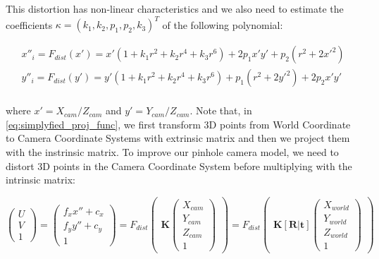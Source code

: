 \documentclass[a4paper]{report}
\numberwithin{figure}{section}
\begin{document}
This distortion has non-linear characteristics and we also 
need to estimate the coefficients 
$\kappa = (k_1, k_2, p_1, p_2, k_3)^T$ of the following polynomial:


\begin{equation}
\begin{split}
  x''_i = F_{dist}(x') = 
  x'(1+ k_1 r^2 + k_2 r^4 + k_3 r^6) + 2 p_1 x' y' + p_2 (r^2+2x'^2)\\
  y''_i = F_{dist}(y') = 
  y'(1+ k_1 r^2 + k_2 r^4 + k_3 r^6) + p_1 (r^2+2y'^2) + 2p_2 x'y'\\
\end{split}
\end{equation}

where $x' = X_{cam}/Z_{cam}$ and $y' = Y_{cam}/Z_{cam}$. 
Note that, in \ref{eq:simplyfied_proj_func}, we first transform 
3D points from World Coordinate to Camera Coordinate Systems with 
extrinsic matrix and then we project them with the instrinsic matrix. 
To improve our pinhole camera model, 
we need to distort 3D points in the Camera Coordinate System before 
multiplying with the intrinsic matrix:

\begin{equation}
  \begin{pmatrix}
    U\\
    V\\
    1
  \end{pmatrix}
  =
  \begin{pmatrix}
    f_x x'' + c_x\\
    f_y y'' + c_y\\
    1
  \end{pmatrix}
    =
    F_{dist}\begin{pmatrix}
      \mathbf{K}
      \begin{pmatrix}
        X_{cam}\\
        Y_{cam}\\
        Z_{cam}\\
        1
      \end{pmatrix}
    \end{pmatrix} 
    =
    F_{dist}\begin{pmatrix}
      \mathbf{K} [\mathbf{R}|\mathbf{t}]
      \begin{pmatrix}
        X_{world}\\
        Y_{world}\\
        Z_{world}\\
        1
      \end{pmatrix}
    \end{pmatrix}
\end{equation} \label{eq:proj_func_w_f_c}
\end{document}
